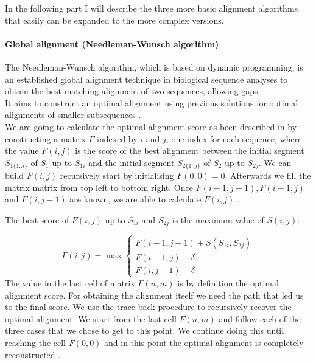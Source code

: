 \documentclass[11pt,a4paper]{report}
\begin{document}
In the following part I will describe the three more basic alignment 
algorithms that easily can be expanded to the more complex versions.





\paragraph{ Global alignment (Needleman-Wunsch algorithm) }

The Needleman-Wunsch algorithm, which is based on dynamic programming, 
is an established global alignment technique in biological 
sequence analyses to obtain the best-matching alignment of two sequences, 
allowing  gaps.\\
It aims to construct an optimal alignment using previous solutions for
optimal alignments of smaller subsequences \cite{durbin}.\\
We are going to calculate the optimal alignment score as been described 
in\cite{durbin} by constructing a matrix $F$ indexed
by $i$ and $j$, one index for each sequence, where the value $F(i, j)$ is the score
of the best alignment between the initial segment $S_{1\{1..i\}}$ of $S_{1}$ 
up to $S_{1i}$ and the initial segment $S_{2\{1..j\}}$ of $S_{2}$  up to 
$S_{2j}$. We can build $F(i, j)$ recursively start by initialising 
$F(0, 0) = 0$. Afterwards we fill the matrix matrix from top left to 
bottom right. 
Once $ F(i-1, j-1 ), F(i-1 , j) $ and $ F(i , j-1) $ are known, we 
are able to calculate $ F(i, j)$ \cite{durbin}.

The best score of $F(i,j)$ up to $S_{1i}$ and $S_{2j}$ is the maximum 
value of $S(i,j)$:

\[ F(i,j)= \max
\begin{cases}
   F(i-1,j-1) + S(S_{1i} , S_{2j})\\
   F(i-1 , j)- \delta\\
   F(i,j-1)- \delta
\end{cases}
\]
The value in the last cell of matrix $F(n,m)$ is by definition the optimal 
alignment score. 
For obtaining the alignment itself we need the path that led us to the 
final score. We use the trace back procedure to recursively recover the 
optimal alignment\cite{durbin}\cite{eddydynamic}.
We start from the last cell $F(n,m)$ and follow each of the three cases 
that we chose to get to this point. We continue doing this until reaching
the cell $F(0,0)$ and in this point the optimal alignment is completely 
reconstructed \cite{eddydynamic}.
\end{document}
